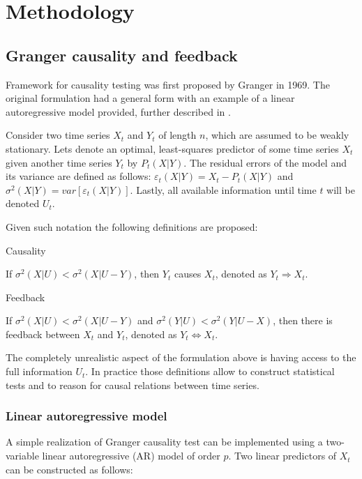 \section{Methodology} \label{sec:methodology}

\subsection{Granger causality and feedback} \label{sec:granger-causality}
Framework for causality testing was first proposed by Granger \cite{granger69} in 1969.
The original formulation had a general form with an example of a linear autoregressive model provided, further described in .

Consider two time series $X_t$ and $Y_t$ of length $n$, which are assumed to be weakly stationary.
Lets denote an optimal, least-squares predictor of some time series $X_t$ given another time series $Y_t$ by $P_t(X|Y)$.
The residual errors of the model and its variance are defined as follows: 
$\varepsilon_t(X|Y) = X_t - P_t(X|Y)$ and $\sigma^2(X|Y) = var[\varepsilon_t(X|Y)]$.
Lastly, all available information until time $t$ will be denoted $U_t$.

Given such notation the following definitions are proposed:

\begin{definition} \label{def:causality}
	Causality

	If $\sigma^2(X|U) < \sigma^2(X|U-Y)$, then $Y_t$ causes $X_t$, denoted as $Y_t \Rightarrow X_t$.
\end{definition}
\begin{definition}
	Feedback

	If $\sigma^2(X|U) < \sigma^2(X|U-Y)$ and $\sigma^2(Y|U) < \sigma^2(Y|U-X)$, then there is feedback between $X_t$ and $Y_t$, denoted as $Y_t \Leftrightarrow X_t$.
\end{definition}

The completely unrealistic aspect of the formulation above is having access to the full information $U_t$.
In practice those definitions allow to construct statistical tests and to reason for causal relations between time series.

\subsubsection{Linear autoregressive model} \label{sec:linear-ar}
A simple realization of Granger causality test can be implemented using a two-variable linear autoregressive (AR) model of order $p$.
Two linear predictors of $X_t$ can be constructed as follows:

